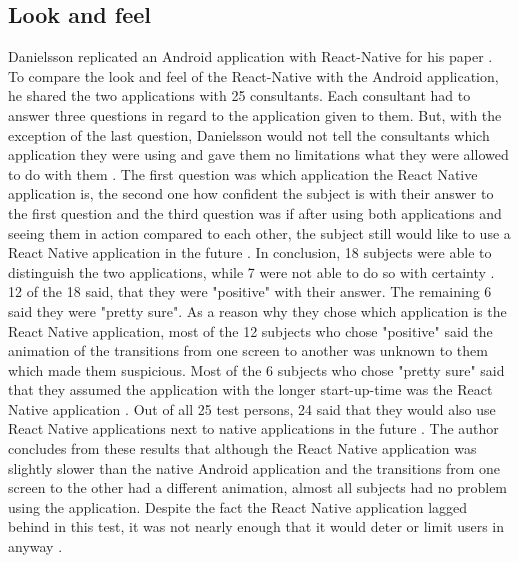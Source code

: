 \documentclass[Bachelor,BIF,english]{twbook}
\begin{document}
\subsection{Look and feel}
Danielsson replicated an Android application with React-Native for his paper \cite{Danielsson_2016}. To compare the look and feel of the React-Native with the Android application, he shared the two applications with 25 consultants. Each consultant had to answer three questions in regard to the application given to them. But, with the exception of the last question, Danielsson would not tell the consultants which application they were using and gave them no limitations what they were allowed to do with them \cite[p.~29]{Danielsson_2016}. The first question was which application the React Native application is, the second one how confident the subject is with their answer to the first question and the third question was if after using both applications and seeing them in action compared to each other, the subject still would like to use a React Native application in the future \cite[p.~29-31]{Danielsson_2016}. In conclusion, 18 subjects were able to distinguish the two applications, while 7 were not able to do so with certainty \cite[p.~30]{Danielsson_2016}. 12 of the 18 said, that they were "positive" with their answer. The remaining 6 said they were "pretty sure". As a reason why they chose which application is the React Native application, most of the 12 subjects who chose "positive" said the animation of the transitions from one screen to another was unknown to them which made them suspicious. Most of the 6 subjects who chose "pretty sure" said that they assumed the application with the longer start-up-time was the React Native application \cite[p.~30]{Danielsson_2016}. Out of all 25 test persons, 24 said that they would also use React Native applications next to native applications in the future \cite[p.~31]{Danielsson_2016}. The author concludes from these results that although the React Native application was slightly slower than the native Android application and the transitions from one screen to the other had a different animation, almost all subjects had no problem using the application. Despite the fact the React Native application lagged behind in this test, it was not nearly enough that it would deter or limit users in anyway \cite[p.~45]{Danielsson_2016}.
\\[\baselineskip]
\end{document}
